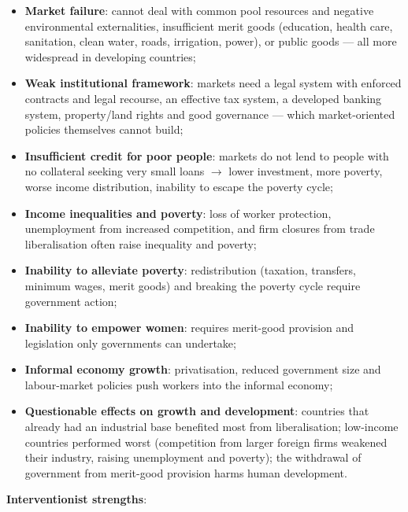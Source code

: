 \documentclass[a4paper,12pt]{article}
\begin{document}
\begin{itemize}
  \item \textbf{Market failure}: cannot deal with common pool resources and negative environmental externalities, insufficient merit goods (education, health care, sanitation, clean water, roads, irrigation, power), or public goods --- all more widespread in developing countries;
  \item \textbf{Weak institutional framework}: markets need a legal system with enforced contracts and legal recourse, an effective tax system, a developed banking system, property/land rights and good governance --- which market-oriented policies themselves cannot build;
  \item \textbf{Insufficient credit for poor people}: markets do not lend to people with no collateral seeking very small loans $\to$ lower investment, more poverty, worse income distribution, inability to escape the poverty cycle;
  \item \textbf{Income inequalities and poverty}: loss of worker protection, unemployment from increased competition, and firm closures from trade liberalisation often raise inequality and poverty;
  \item \textbf{Inability to alleviate poverty}: redistribution (taxation, transfers, minimum wages, merit goods) and breaking the poverty cycle require government action;
  \item \textbf{Inability to empower women}: requires merit-good provision and legislation only governments can undertake;
  \item \textbf{Informal economy growth}: privatisation, reduced government size and labour-market policies push workers into the informal economy;
  \item \textbf{Questionable effects on growth and development}: countries that already had an industrial base benefited most from liberalisation; low-income countries performed worst (competition from larger foreign firms weakened their industry, raising unemployment and poverty); the withdrawal of government from merit-good provision harms human development.
\end{itemize}
\textbf{Interventionist strengths}:
\end{document}
